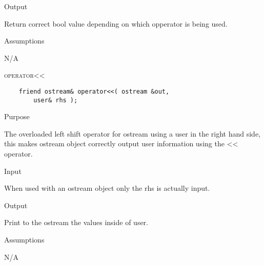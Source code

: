 \documentclass[pdftex, 12pt]{article}
\begin{document}
\begin{description}
\begin{description}
			\item{Output}

				Return correct bool value depending on which opperator is being used.

			\item{Assumptions}

				N/A

		\end{description}

	\item{\textsc{operator<<}}
\begin{lstlisting}
	friend ostream& operator<<( ostream &out,
		user& rhs );
\end{lstlisting}
		\begin{description}

			\item{Purpose}

				The overloaded left shift operator for ostream using a user in the right hand side, this makes ostream
				object correctly output user information using the << operator.

			\item{Input}

				When used with an ostream object only the rhs is actually input.

			\item{Output}

				Print to the ostream the values inside of user.

			\item{Assumptions}

				N/A

		\end{description}

\end{description}
\end{document}
